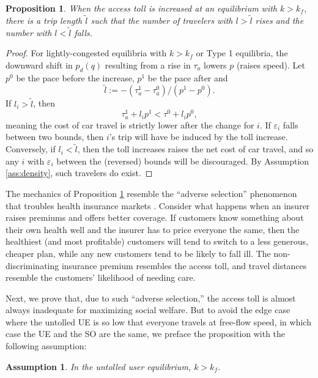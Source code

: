 \documentclass[preprint,authoryear]{elsarticle}
\newcommand{\taua}{\tau_a}
\newcommand{\ve}{\varepsilon}
\newcommand{\ltilde}{\tilde{l}}
\newtheorem{proposition}{Proposition}
\newtheorem{assumption}{Assumption}
\begin{document}
\begin{proposition}\label{prop:adverse}
When the access toll is increased at an equilibrium with $k>k_f$, there is a trip length $\ltilde$ such that the number of travelers with $l>\tilde{l}$ rises and the number with $l<\tilde{l}$ falls.
\end{proposition}
\begin{proof}
	For lightly-congested equilibria with $k>k_f$ or Type 1 equilibria, the downward shift in $p_d(q)$ resulting from a rise in $\taua$ lowers $p$ (raises speed). Let $p^0$ be the pace before the increase, $p^1$ be the pace after and 
	\begin{equation}
	\ltilde := -(\taua^1 - \taua^0)/(p^1-p^0).	
	\end{equation}
	If $l_i > \ltilde$, then
	\begin{equation}
		\taua^1 + l_i p^1 < \tau^0 + l_i p^0,
	\end{equation}
	meaning the cost of car travel is strictly lower after the change for $i$. If $\ve_i$ falls between two bounds, then $i$'s trip will have be induced by the toll increase. Conversely, if $l_i<\ltilde$, then the toll increases raises the net cost of car travel, and so any $i$ with $\ve_i$ between the (reversed) bounds will be discouraged. By Assumption \ref{ass:density}, such travelers do exist.
\end{proof}

The mechanics of Proposition \ref{prop:adverse} resemble the ``adverse selection'' phenomenon that troubles health insurance markets \citep{Akerlof1970a}. Consider what happens when an insurer raises premiums and offers better coverage. If customers know something about their own health well and the insurer has to price everyone the same, then the healthiest (and most profitable) customers will tend to switch to a less generous, cheaper plan, while any new customers tend to be likely to fall ill. The non-discriminating insurance premium resembles the access toll, and travel distances resemble the customers' likelihood of needing care.

Next, we prove that, due to such ``adverse selection,'' the access toll is almost always inadequate for maximizing social welfare. But to avoid the edge case where the untolled UE is so low that everyone travels at free-flow speed, in which case the UE and the SO are the same, we preface the proposition with the following assumption:

\begin{assumption}
	In the untolled user equilibrium, $k>k_f$.
\end{assumption}
\end{document}
